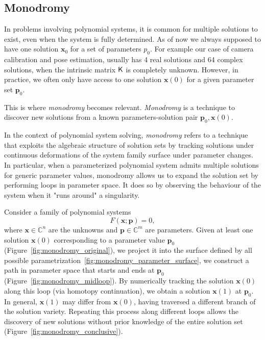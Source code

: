 \subsection{Monodromy}
\label{sec:monodromy}

In problems involving polynomial systems, it is common for multiple solutions to exist, even when the system is fully determined. As of now we always supposed to have one solution $\mathbf{x}_0$ for a set of parameters \(p_0\).
For example our case of camera calibration and pose estimation, usually has 4 real solutions and 64 complex solutions, when the intrinsic matrix $\mathsf{K}$ is completely unknown. However, in practice, we often only have access to one solution \(\mathbf{x}(0)\) for a given parameter set \(\mathbf{p}_0\).

This is where \emph{monodromy} becomes relevant. \emph{Monodromy} is a technique to discover new solutions from a known parameters-solution pair \(\mathbf{p}_0, \mathbf{x}(0)\).

In the context of polynomial system solving, \emph{monodromy} refers to a technique that exploits the algebraic structure of solution sets by tracking solutions under continuous deformations of the system family surface under parameter changes. In particular, when a parameterized polynomial system admits multiple solutions for generic parameter values, monodromy allows us to expand the solution set by performing loops in parameter space. It does so by observing the behaviour of the system when it "runs around" a singularity.

Consider a family of polynomial systems
\[
F(\mathbf{x}; \mathbf{p}) = 0,
\]
where \( \mathbf{x} \in \mathbb{C}^n \) are the unknowns and \( \mathbf{p} \in \mathbb{C}^m \) are parameters. Given at least one solution \( \mathbf{x}(0) \) corresponding to a parameter value \( \mathbf{p}_0 \) (Figure~\ref{fig:monodromy_original}), we project it into the surface defined by all possible parametrization~\ref{fig:monodromy_parameter_surface}, we construct a path in parameter space that starts and ends at \( \mathbf{p}_0 \) (Figure~\ref{fig:monodromy_midloop}). By numerically tracking the solution \( \mathbf{x}(0) \) along this loop (via homotopy continuation), we obtain a solution \( \mathbf{x}(1) \) at \( \mathbf{p}_0 \). In general, \( \mathbf{x}(1) \) may differ from \( \mathbf{x}(0) \), having traversed a different branch of the solution variety. Repeating this process along different loops allows the discovery of new solutions without prior knowledge of the entire solution set (Figure~\ref{fig:monodromy_conclusive}).

